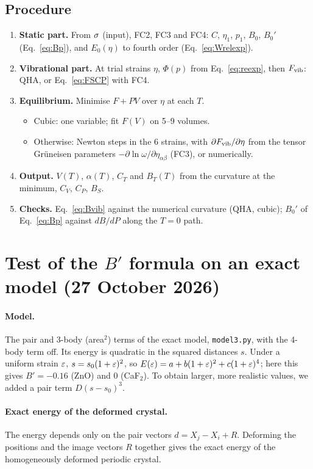 \documentclass[11pt,a4paper]{article}
\newcommand{\al}{\alpha}\newcommand{\be}{\beta}\newcommand{\ga}{\gamma}\newcommand{\de}{\delta}
\begin{document}
\subsection{Procedure}
\begin{enumerate}
\item \textbf{Static part.} From $\sigma$ (input), FC2, FC3 and FC4: $C$, $\eta_1$, $p_1$, $B_0$, $B_0'$
  (Eq.~\eqref{eq:Bp}), and $E_0(\eta)$ to fourth order (Eq.~\eqref{eq:Wrelexp}).
\item \textbf{Vibrational part.} At trial strains $\eta$, $\Phi(p)$ from Eq.~\eqref{eq:reexp}, then $F_{\rm vib}$:
  QHA, or Eq.~\eqref{eq:FSCP} with FC4.
\item \textbf{Equilibrium.} Minimise $F+PV$ over $\eta$ at each $T$.
  \begin{itemize}
  \item Cubic: one variable; fit $F(V)$ on 5--9 volumes.
  \item Otherwise: Newton steps in the 6 strains, with $\partial F_{\rm vib}/\partial\eta$ from the tensor Gr\"uneisen
    parameters $-\partial\ln\omega/\partial\eta_{\al\be}$ (FC3), or numerically.
  \end{itemize}
\item \textbf{Output.} $V(T)$, $\alpha(T)$, $C_T$ and $B_T(T)$ from the curvature at the minimum, $C_V$, $C_P$, $B_S$.
\item \textbf{Checks.} Eq.~\eqref{eq:Bvib} against the numerical curvature (QHA, cubic); $B_0'$ of Eq.~\eqref{eq:Bp}
  against $dB/dP$ along the $T=0$ path.
\end{enumerate}

\section{Test of the \texorpdfstring{$B'$}{B'} formula on an exact model (27 October 2026)}
\paragraph{Model.} The pair and 3-body (area$^2$) terms of the exact model, \texttt{model3.py}, with
the 4-body term off. Its energy is quadratic in the squared distances $s$. Under a uniform strain $\varepsilon$,
$s=s_0(1+\varepsilon)^2$, so $E(\varepsilon)=a+b(1+\varepsilon)^2+c(1+\varepsilon)^4$; here this gives $B'=-0.16$ (ZnO) and 0 (CaF$_2$). To
obtain larger, more realistic values, we added a pair term $D(s-s_0)^3$.

\paragraph{Exact energy of the deformed crystal.} The energy depends only on the pair vectors
$d=X_j-X_i+R$. Deforming the positions and the image vectors $R$ together gives the exact energy of the
homogeneously deformed periodic crystal.
\end{document}
